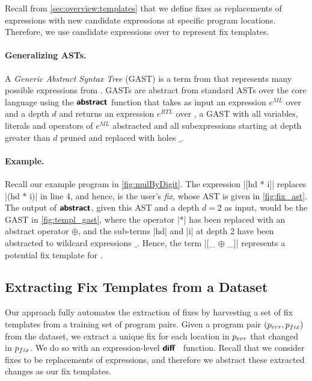 Recall from \autoref{sec:overview:templates} that we define fixes as
replacements of expressions with new candidate expressions at specific program
locations. Therefore, we use candidate expressions over \repairLang to represent
fix templates.

\paragraph{Generalizing ASTs.}
A \emph{Generic Abstract Syntax Tree} (GAST) is a term from \repairLang that
represents many possible expressions from \lang. GASTs are abstract from
standard ASTs over the core language \lang using the $\bm{\mathsf{abstract}}$ function that
takes as input an expression $e^{ML}$ over \lang and a depth $d$ and returns an
expression $e^{RTL}$ over \repairLang, \ie a GAST with all variables, literals
and operators of $e^{ML}$ abstracted and all subexpressions starting at depth
greater than $d$ pruned and replaced with holes $\_$.

\paragraph{Example.}
Recall our example program \mbd in \autoref{fig:mulByDigit}.
%
The expression |[hd * i]| replaces |(hd * i)| in line 4, and hence, is the
user's \emph{fix}, whose AST is given in \autoref{fig:fix_ast}.
%
The output of $\bm{\mathsf{abstract}}$, given this AST and a depth $d = 2$ as input, would be
the GAST in \autoref{fig:templ_gast}, where the operator |*| has been replaced
with an abstract operator $\oplus$, and the sub-terms |hd| and |i| at depth 2
have been abstracted to wildcard expressions $\_$.
%
Hence, the \repairLang term |[_ $\oplus$ _]| represents a potential fix template
for \mbd.



\subsection{Extracting Fix Templates from a Dataset}
\label{sec:templ-partition:templates}

Our approach fully automates the extraction of fixes by harvesting a set of fix
templates from a training set of program pairs.
%
Given a program pair $(p_{err}, p_{fix})$ from the dataset, we extract a unique fix
for each location in $p_{err}$ that changed in $p_{fix}$.
%
We do so with an expression-level $\bm{\mathsf{diff}}$~\citep{Lempsink2009-xf} function.
%
Recall that we consider fixes to be replacements of expressions, and
therefore we abstract these extracted changes as our fix templates.

